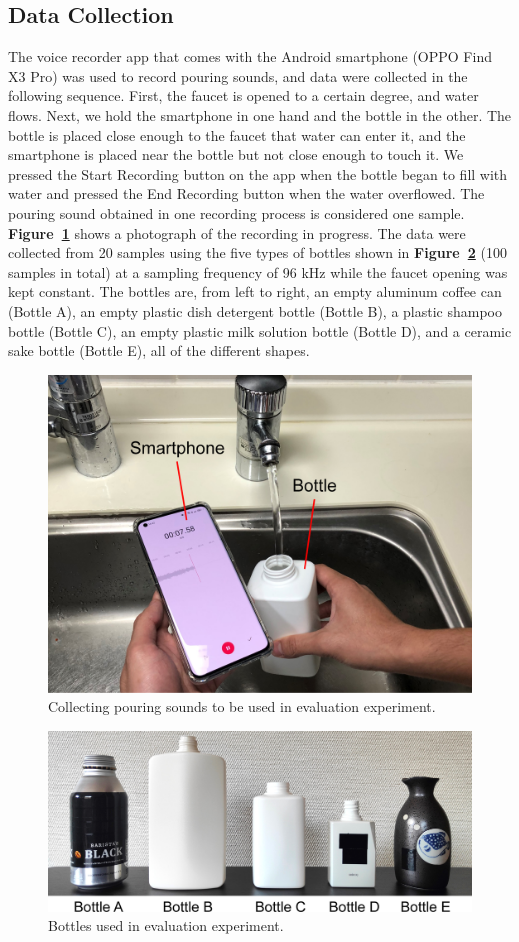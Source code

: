 \documentclass[manuscript,screen,anonymous,review]{acmart}
\newcommand\figref[1]{\textbf{Figure~\ref{fig:#1}}}
\begin{document}
\subsection{Data Collection}
The voice recorder app that comes with the Android smartphone (OPPO Find X3 Pro) was used to record pouring sounds, and data were collected in the following sequence. First, the faucet is opened to a certain degree, and water flows. Next, we hold the smartphone in one hand and the bottle in the other. The bottle is placed close enough to the faucet that water can enter it, and the smartphone is placed near the bottle but not close enough to touch it. We pressed the Start Recording button on the app when the bottle began to fill with water and pressed the End Recording button when the water overflowed. The pouring sound obtained in one recording process is considered one sample. \figref{data_acquisition} shows a photograph of the recording in progress. The data were collected from 20 samples using the five types of bottles shown in \figref{bottles} (100 samples in total) at a sampling frequency of 96 kHz while the faucet opening was kept constant. The bottles are, from left to right, an empty aluminum coffee can (Bottle A), an empty plastic dish detergent bottle (Bottle B), a plastic shampoo bottle (Bottle C), an empty plastic milk solution bottle (Bottle D), and a ceramic sake bottle (Bottle E), all of the different shapes.

\begin{figure}[!t]
  \centering
  \includegraphics[width=0.7\linewidth]{figures/data_acquisition.eps}
  \caption{Collecting pouring sounds to be used in evaluation experiment.}
  \label{fig:data_acquisition}
\end{figure}

\begin{figure}[!t]
  \centering
  \includegraphics[width=0.7\linewidth]{figures/bottles.eps}
  \caption{Bottles used in evaluation experiment.}
  \label{fig:bottles}
\end{figure}
\end{document}

